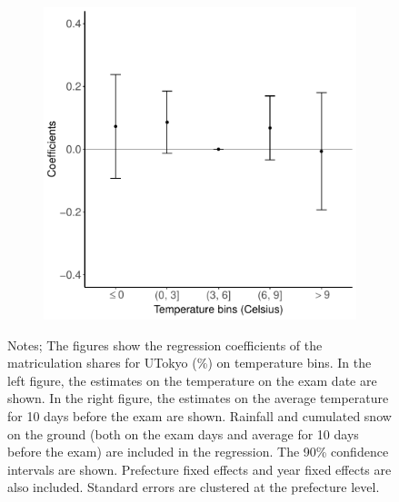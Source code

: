 \documentclass[10pt, pdfmx,hiresbb]{beamer}
\begin{document}
\begin{frame}
\begin{figure}
\begin{minipage}{0.43\textwidth}
\begin{figure}[h]
        \includegraphics[width = \textwidth]{../Output/images/reg_pre10_pre10_4.pdf}
        \centering
      \end{figure}
    \end{minipage}
    \tiny
    \begin{tablenotes}
    \item Notes;
      The figures show the regression coefficients of the matriculation shares for UTokyo (\%) on temperature bins.
      In the left figure, the estimates on the temperature on the exam date are shown.
      In the right figure, the estimates on the average temperature for 10 days before the exam are shown.
      Rainfall and cumulated snow on the ground (both on the exam days and average for 10 days before the exam) are included in the regression.
      The 90\% confidence intervals are shown.
      Prefecture fixed effects and year fixed effects are also included.
      Standard errors are clustered at the prefecture level.
    \end{tablenotes}
  \end{figure}
\end{frame}
\end{document}
